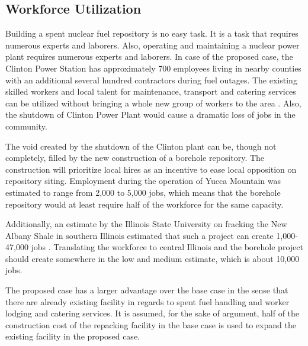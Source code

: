 \subsection{Workforce Utilization}

Building a spent nuclear fuel repository is no easy task. It is a task that requires
numerous experts and laborers. Also, operating and maintaining a nuclear power plant
requires numerous experts and laborers. In case of the proposed case, the Clinton
 Power Station has approximately 700 employees living in nearby counties with an
additional several hundred contractors during fuel 
outages\cite{exelon_clinton_2016}.
The existing skilled workers and local talent for maintenance, transport and catering
services can be utilized without bringing a whole new group of workers to the 
area \cite{iaea_managing_2008}. Also, the shutdown of Clinton Power Plant would cause a dramatic
loss of jobs in the community. 




The void created by the shutdown of the Clinton plant can be, though not
completely, filled by the new construction of a borehole repository. The construction
will prioritize local hires as an incentive to ease local opposition on repository
 siting. Employment during the operation of Yucca Mountain was estimated to range from
 2,000 to 5,000 jobs, \cite{riddel_economic_2003} which means that the borehole repository
 would at least require half of the workforce for the same capacity. 

Additionally, an estimate by the Illinois State University on fracking the New Albany
Shale in southern Illinois estimated that such a project can create 1,000-47,000 jobs
\cite{loomis_potential_2012}. Translating the workforce to central Illinois and the borehole
project should create somewhere in the low and medium estimate, which is about 10,000
jobs.   

%

The proposed case has a larger advantage over the base case in the sense that there
are already existing facility in regards to spent fuel handling and worker lodging 
and catering services. 
It is assumed, for the sake of argument, half of the construction cost of the
repacking facility in the base case is used to expand the existing facility in the
proposed case. 


